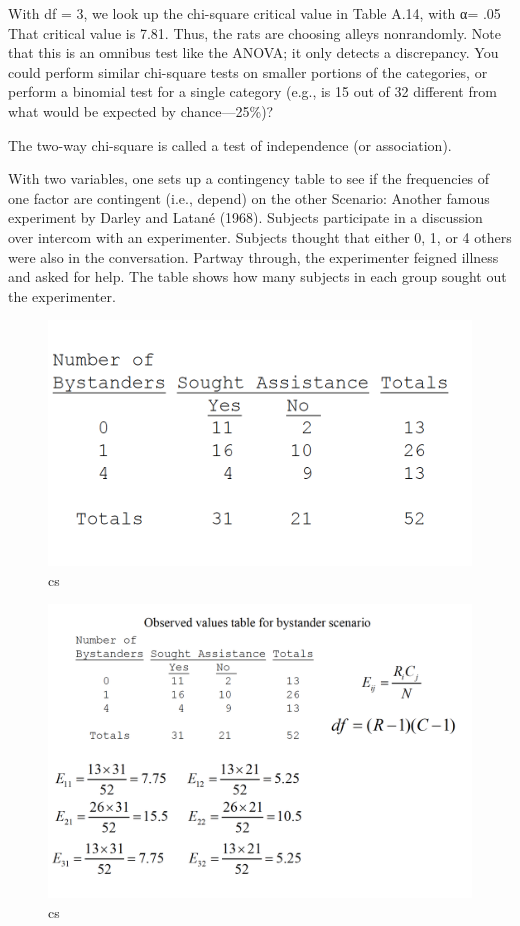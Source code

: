 \documentclass[]{book}
\theoremstyle{definition}
\theoremstyle{definition}
\theoremstyle{definition}
\theoremstyle{remark}
\begin{document}
With df = 3, we look up the chi-square critical value in Table A.14,
with α= .05 That critical value is 7.81. Thus, the rats are choosing
alleys nonrandomly. Note that this is an omnibus test like the ANOVA; it
only detects a discrepancy. You could perform similar chi-square tests
on smaller portions of the categories, or perform a binomial test for a
single category (e.g., is 15 out of 32 different from what would be
expected by chance---25\%)?

The two-way chi-square is called a test of independence (or
association).

With two variables, one sets up a contingency table to see if the
frequencies of one factor are contingent (i.e., depend) on the other
Scenario: Another famous experiment by Darley and Latané (1968).
Subjects participate in a discussion over intercom with an experimenter.
Subjects thought that either 0, 1, or 4 others were also in the
conversation. Partway through, the experimenter feigned illness and
asked for help. The table shows how many subjects in each group sought
out the experimenter.

\begin{figure}
\centering
\includegraphics{img/hickscs5.png}
\caption{cs}
\end{figure}

\begin{figure}
\centering
\includegraphics{img/hickscs6.png}
\caption{cs}
\end{figure}
\end{document}
